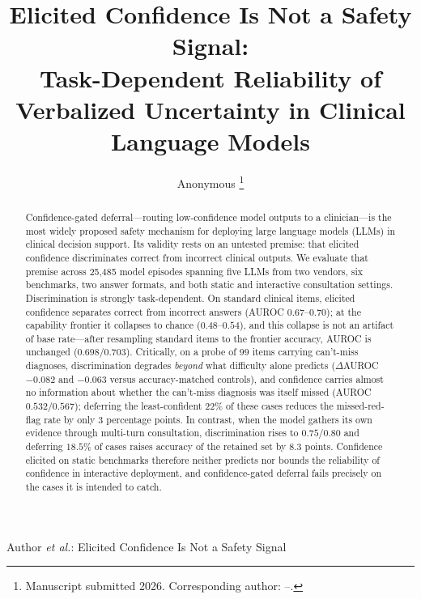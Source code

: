 \documentclass[journal,twoside]{IEEEtran}
\begin{document}
\title{Elicited Confidence Is Not a Safety Signal:\\
Task-Dependent Reliability of Verbalized Uncertainty in Clinical Language Models}

\author{Anonymous
\thanks{Manuscript submitted 2026. Corresponding author: --.}}

%
{Author \MakeLowercase{\textit{et al.}}: Elicited Confidence Is Not a Safety Signal}

\maketitle

\begin{abstract}
Confidence-gated deferral---routing low-confidence model outputs to a clinician---is the most
widely proposed safety mechanism for deploying large language models (LLMs) in clinical decision
support. Its validity rests on an untested premise: that elicited confidence discriminates correct
from incorrect clinical outputs. We evaluate that premise across 25{,}485 model episodes spanning
five LLMs from two vendors, six benchmarks, two answer formats, and both static and interactive
consultation settings. Discrimination is strongly task-dependent. On standard clinical items,
elicited confidence separates correct from incorrect answers (AUROC $0.67$--$0.70$); at the
capability frontier it collapses to chance ($0.48$--$0.54$), and this collapse is not an artifact of
base rate---after resampling standard items to the frontier accuracy, AUROC is unchanged
($0.698$/$0.703$). Critically, on a probe of 99 items carrying can't-miss diagnoses, discrimination
degrades \emph{beyond} what difficulty alone predicts ($\Delta$AUROC $-0.082$ and $-0.063$ versus
accuracy-matched controls), and confidence carries almost no information about whether the
can't-miss diagnosis was itself missed (AUROC $0.532$/$0.567$); deferring the least-confident $22\%$
of these cases reduces the missed-red-flag rate by only $3$ percentage points. In contrast, when the
model gathers its own evidence through multi-turn consultation, discrimination rises to $0.75$/$0.80$
and deferring $18.5\%$ of cases raises accuracy of the retained set by $8.3$ points. Confidence
elicited on static benchmarks therefore neither predicts nor bounds the reliability of confidence in
interactive deployment, and confidence-gated deferral fails precisely on the cases it is intended to
catch.
\end{abstract}
\end{document}
